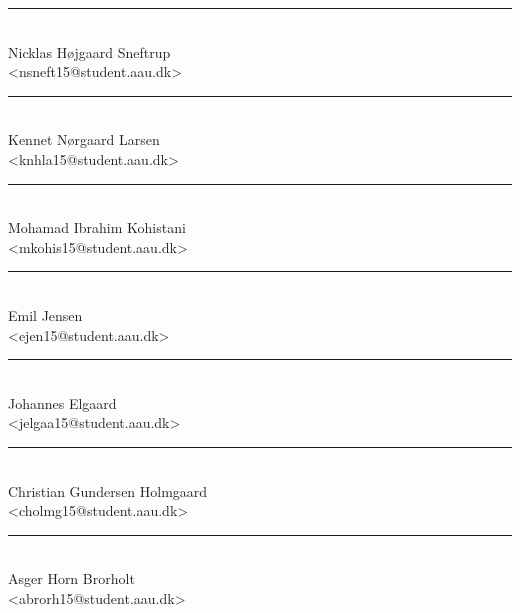 \begin{minipage}[b]{0.45\textwidth}
 \centering
 \vspace{12pt}
 \rule{\textwidth}{0.5pt}\\
  Nicklas Højgaard Sneftrup\\
 {\footnotesize <nsneft15@student.aau.dk>}\\
 \vspace{12pt}
 \centering
 \vspace{12pt}
 \rule{\textwidth}{0.5pt}\\
  Kennet Nørgaard Larsen\\
 {\footnotesize <knhla15@student.aau.dk>}\\
 \vspace{12pt}
 \centering
 \vspace{12pt}
 \rule{\textwidth}{0.5pt}\\
  Mohamad Ibrahim Kohistani\\
 {\footnotesize <mkohis15@student.aau.dk>}\\
 \vspace{12pt}
\end{minipage}
\hfill
\begin{minipage}[b]{0.45\textwidth}
 \centering
 \vspace{12pt}
 \rule{\textwidth}{0.5pt}\\
  Emil Jensen\\
 {\footnotesize <ejen15@student.aau.dk>}\\
 \vspace{12pt}
 \centering
 \vspace{12pt}
 \rule{\textwidth}{0.5pt}\\
  Johannes Elgaard\\
 {\footnotesize <jelgaa15@student.aau.dk>}\\
 \vspace{12pt}
\centering
 \vspace{12pt}
 \rule{\textwidth}{0.5pt}\\
  Christian Gundersen Holmgaard\\
 {\footnotesize <cholmg15@student.aau.dk>}\\
 \vspace{12pt}
\end{minipage}
\hfill
\begin{minipage}[b]{1.0\textwidth}
 \centering
 \vspace{12pt}
 \rule{\textwidth}{0.5pt}\\
  Asger Horn Brorholt\\
 {\footnotesize <abrorh15@student.aau.dk>}\\
 \vspace{12pt}
\end{minipage}%